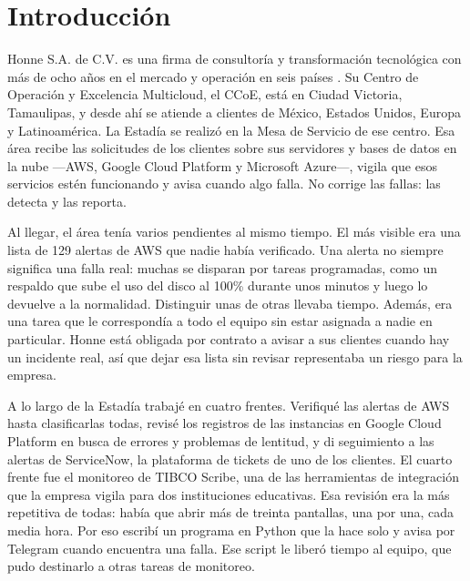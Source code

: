 \section{Introducción}
\label{ch:introduccion}

Honne S.A. de C.V. es una firma de consultoría y transformación tecnológica con más de ocho años en el mercado y operación en seis países \cite{honne_oficial_2026}. Su Centro de Operación y Excelencia Multicloud, el CCoE, está en Ciudad Victoria, Tamaulipas, y desde ahí se atiende a clientes de México, Estados Unidos, Europa y Latinoamérica. La Estadía se realizó en la Mesa de Servicio de ese centro. Esa área recibe las solicitudes de los clientes sobre sus servidores y bases de datos en la nube —AWS, Google Cloud Platform y Microsoft Azure—, vigila que esos servicios estén funcionando y avisa cuando algo falla. No corrige las fallas: las detecta y las reporta.

Al llegar, el área tenía varios pendientes al mismo tiempo. El más visible era una lista de 129 alertas de AWS que nadie había verificado. Una alerta no siempre significa una falla real: muchas se disparan por tareas programadas, como un respaldo que sube el uso del disco al 100\% durante unos minutos y luego lo devuelve a la normalidad. Distinguir unas de otras llevaba tiempo. Además, era una tarea que le correspondía a todo el equipo sin estar asignada a nadie en particular. Honne está obligada por contrato a avisar a sus clientes cuando hay un incidente real, así que dejar esa lista sin revisar representaba un riesgo para la empresa.

A lo largo de la Estadía trabajé en cuatro frentes. Verifiqué las alertas de AWS hasta clasificarlas todas, revisé los registros de las instancias en Google Cloud Platform en busca de errores y problemas de lentitud, y di seguimiento a las alertas de ServiceNow, la plataforma de tickets de uno de los clientes. El cuarto frente fue el monitoreo de TIBCO Scribe, una de las herramientas de integración que la empresa vigila para dos instituciones educativas. Esa revisión era la más repetitiva de todas: había que abrir más de treinta pantallas, una por una, cada media hora. Por eso escribí un programa en Python que la hace solo y avisa por Telegram cuando encuentra una falla. Ese script le liberó tiempo al equipo, que pudo destinarlo a otras tareas de monitoreo.
